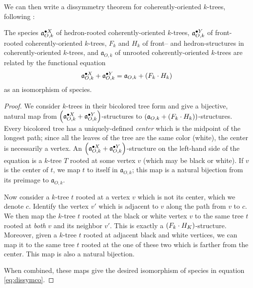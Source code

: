 \documentclass[sectionflow,singlespace,twoside]{brandiss} %
\numberwithin{section}{chapter}
\numberwithin{figure}{chapter}
\begin{document}
We can then write a dissymmetry theorem for coherently-oriented $k$-trees, following \cite[\S 3.2, eq.\ (54)]{bll:species}:
\begin{theorem}
  \label{thm:dissymco}
  The species $\pointed[X]{\mathfrak{a}}_{O, k}$ of hedron-rooted coherently-oriented $k$-trees, $\pointed[Y]{\mathfrak{a}}_{O, k}$ of front-rooted coherently-oriented $k$-trees, $F_{k}$ and $H_{k}$ of front-- and hedron-structures in coherently-oriented $k$-trees, and $\mathfrak{a}_{O, k}$ of unrooted coherently-oriented $k$-trees are related by the functional equation
  \begin{equation}
    \label{eq:dissymco}
    \pointed[X]{\mathfrak{a}}_{O, k} + \pointed[Y]{\mathfrak{a}}_{O, k} = \mathfrak{a}_{O, k} + \pbrac{F_{k} \cdot H_{k}}
  \end{equation}
  as an isomorphism of species.
\end{theorem}

\begin{proof}
  We consider $k$-trees in their bicolored tree form and give a bijective, natural map from $\pbrac{\pointed[X]{\mathfrak{a}}_{O, k} + \pointed[Y]{\mathfrak{a}}_{O, k}}$-structures to $\pbrac{\mathfrak{a}_{O, k} + \pbrac{F_{k} \cdot H_{k}}}$-structures.
  Every bicolored tree has a uniquely-defined \emph{center} which is the midpoint of the longest path; since all the leaves of the tree are the same color (white), the center is necessarily a vertex.
  An $\pbrac{\pointed[X]{\mathfrak{a}}_{O, k} + \pointed[Y]{\mathfrak{a}}_{O, k}}$-structure on the left-hand side of the equation is a $k$-tree $T$ rooted at some vertex $v$ (which may be black or white).
  If $v$ is the center of $t$, we map $t$ to itself in $\mathfrak{a}_{O, k}$; this map is a natural bijection from its preimage to $\mathfrak{a}_{O, k}$.

  Now consider a $k$-tree $t$ rooted at a vertex $v$ which is not its center, which we denote $c$.
  Identify the vertex $v'$ which is adjacent to $v$ along the path from $v$ to $c$.
  We then map the $k$-tree $t$ rooted at the black or white vertex $v$ to the same tree $t$ rooted at \emph{both} $v$ and its neighbor $v'$.
  This is exactly a $\pbrac{F_{k} \cdot H_{K}}$-structure.
  Moreover, given a $k$-tree $t$ rooted at adjacent black and white vertices, we can map it to the same tree $t$ rooted at the one of these two which is farther from the center.
  This map is also a natural bijection.

  When combined, these maps give the desired isomorphism of species in equation \eqref{eq:dissymco}.
\end{proof}
\end{document}
